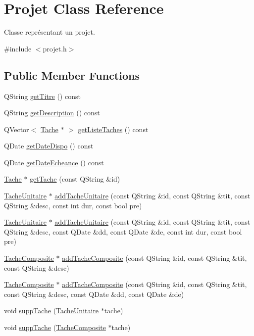 \hypertarget{class_projet}{}\section{Projet Class Reference}
\label{class_projet}


Classe représentant un projet.  




{\ttfamily \#include $<$projet.\+h$>$}

\subsection*{Public Member Functions}
\begin{DoxyCompactItemize}
\item 
Q\+String \hyperlink{class_projet_aafdae1361272085ee8683738d70d0612}{get\+Titre} () const 
\item 
Q\+String \hyperlink{class_projet_a4b939075b8f652846f8fc6457343219e}{get\+Description} () const 
\item 
Q\+Vector$<$ \hyperlink{class_tache}{Tache} $\ast$ $>$ \hyperlink{class_projet_abc5c0c5980be9a1639651dc23789f068}{get\+Liste\+Taches} () const 
\item 
Q\+Date \hyperlink{class_projet_a226d910000aaecf7e44399f2226496f5}{get\+Date\+Dispo} () const 
\item 
Q\+Date \hyperlink{class_projet_a6a54a69a00cbaebd362e02f8e7dc3803}{get\+Date\+Echeance} () const 
\item 
\hyperlink{class_tache}{Tache} $\ast$ \hyperlink{class_projet_a4bd470370df8fd883386069a90b958e2}{get\+Tache} (const Q\+String \&id)
\item 
\hyperlink{class_tache_unitaire}{Tache\+Unitaire} $\ast$ \hyperlink{class_projet_a3dfe2bda911378a958b57a6684624804}{add\+Tache\+Unitaire} (const Q\+String \&id, const Q\+String \&tit, const Q\+String \&desc, const int dur, const bool pre)
\item 
\hyperlink{class_tache_unitaire}{Tache\+Unitaire} $\ast$ \hyperlink{class_projet_a8434e7255cace66ff199cb0ba6636535}{add\+Tache\+Unitaire} (const Q\+String \&id, const Q\+String \&tit, const Q\+String \&desc, const Q\+Date \&dd, const Q\+Date \&de, const int dur, const bool pre)
\item 
\hyperlink{class_tache_composite}{Tache\+Composite} $\ast$ \hyperlink{class_projet_aa5f49aee0f30445f1e612311848b78ba}{add\+Tache\+Composite} (const Q\+String \&id, const Q\+String \&tit, const Q\+String \&desc)
\item 
\hyperlink{class_tache_composite}{Tache\+Composite} $\ast$ \hyperlink{class_projet_aee6a754a368eb0ea47b2fa7317ea5055}{add\+Tache\+Composite} (const Q\+String \&id, const Q\+String \&tit, const Q\+String \&desc, const Q\+Date \&dd, const Q\+Date \&de)
\item 
void \hyperlink{class_projet_a649b8123c195bc575871576c9f350d14}{supp\+Tache} (\hyperlink{class_tache_unitaire}{Tache\+Unitaire} $\ast$tache)
\item 
void \hyperlink{class_projet_a1af5c7716e8893066418afc5e8c09f3c}{supp\+Tache} (\hyperlink{class_tache_composite}{Tache\+Composite} $\ast$tache)
\end{DoxyCompactItemize}
